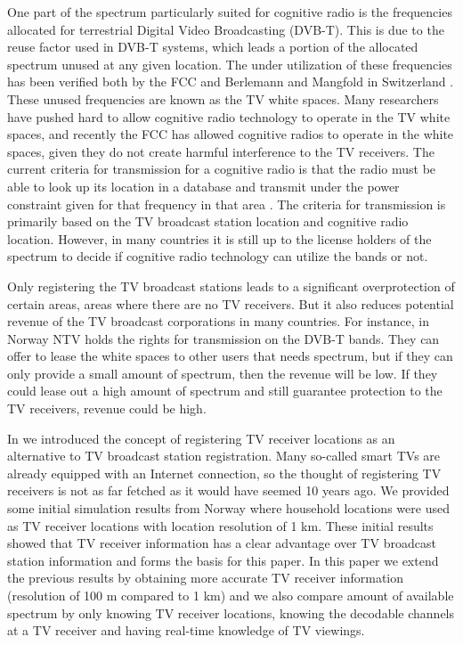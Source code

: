 \documentclass[journal,11pt,draftclsnofoot,onecolumn]{IEEEtran}
\begin{document}
One part of the spectrum particularly suited for cognitive radio is the frequencies allocated for terrestrial Digital Video Broadcasting (DVB-T). This is due to the reuse factor used in DVB-T systems, which leads a portion of the allocated spectrum unused at any given location. The under utilization of these frequencies has been verified both by the FCC \cite{fcc5} and Berlemann and Mangfold in Switzerland \cite{BerlemannMangold2009}. These unused frequencies are known as the TV white spaces. Many researchers have pushed hard to allow cognitive radio technology to operate in the TV white spaces, and recently the FCC has allowed cognitive radios to operate in the white spaces, given they do not create harmful interference to the TV receivers. The current criteria for transmission for a cognitive radio is that the radio must be able to look up its location in a database and transmit under the power constraint given for that frequency in that area \cite{FCC_2010}. The criteria for transmission is primarily based on the TV broadcast station location and cognitive radio location. However, in many countries it is still up to the license holders of the spectrum to decide if cognitive radio technology can utilize the bands or not.

Only registering the TV broadcast stations leads to a significant overprotection of certain areas, areas where there are no TV receivers. But it also reduces potential revenue of the TV broadcast corporations in many countries. For instance, in Norway NTV holds the rights for transmission on the DVB-T bands. They can offer to lease the white spaces to other users that needs spectrum, but if they can only provide a small amount of spectrum, then the revenue will be low. If they could lease out a high amount of spectrum and still guarantee protection to the TV receivers, revenue could be high.

In \cite{hemdan} we introduced the concept of registering TV receiver locations as an alternative to TV broadcast station registration. Many so-called smart TVs are already equipped with an Internet connection, so the thought of registering TV receivers is not as far fetched as it would have seemed 10 years ago. We provided some initial simulation results from Norway where household locations were used as TV receiver locations with location resolution of 1 km. These initial results showed that TV receiver information has a clear advantage over TV broadcast station information and forms the basis for this paper. In this paper we extend the previous results by obtaining more accurate TV receiver information (resolution of 100 m compared to 1 km) and we also compare amount of available spectrum by only knowing TV receiver locations, knowing the decodable channels at a TV receiver and having real-time knowledge of TV viewings. 
\end{document}

